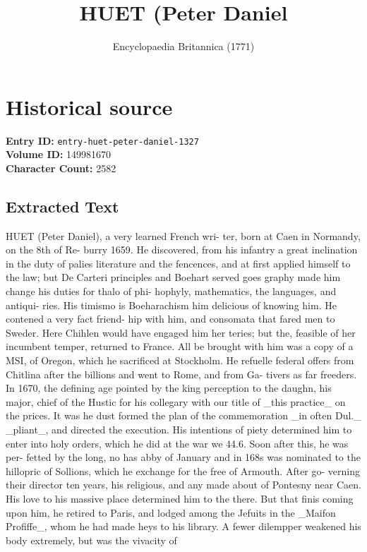 \documentclass{article}
\title{HUET (Peter Daniel}
\date{Encyclopaedia Britannica (1771)}
\begin{document}
\maketitle

\section*{Historical source}
\textbf{Entry ID:} \texttt{entry-huet-peter-daniel-1327} \\
\textbf{Volume ID:} 149981670 \\
\textbf{Character Count:} 2582

\subsection*{Extracted Text}
HUET (Peter Daniel), a very learned French wri-
ter, born at Caen in Normandy, on the 8th of Re-
burry 1659. He discovered, from his infantry a
great inclination in the duty of palies literature and
the fencences, and at first applied himself to the law;
but De Carteri principles and Boehart served goes
graphy made him change his duties for thalo of phi-
hophyly, mathematics, the languages, and antiqui-
ries. His timismo is Boeharachism him delicious
of knowing him. He contened a very fact friend-
hip with him, and consomata that fared men to
Sweder. Here Chihlen would have engaged him
her teries; but the, feasible of her incumbent temper,
returned to France. All be brought with him was a
copy of a MSI, of Oregon, which he sacrificed at
Stockholm. He refuelle federal offers from Chitlina
after the billions and went to Rome, and from Ga-
tivers as far freeders. In 1670, the defining age
pointed by the king perception to the daughn, his
major, chief of the Hustic for his collegary with our
title of \_this practice\_ on the prices. It was he dust
formed the plan of the commemoration \_in often Dul.\_
\_pliant\_, and directed the execution. His intentions of
piety determined him to enter into holy orders, which
he did at the war we 44.6. Soon after this, he was per-
fetted by the long, no has abby of January and in
168s was nominated to the hillopric of Sollions, which
he exchange for the free of Armouth. After go-
verning their director ten years, his religious, and any
made about of Pontesny near Caen. His love to his
massive place determined him to the there. But that
finis coming upon him, he retired to Paris, and lodged
among the Jefuits in the \_Maifon Profiffe\_, whom he had made heys to his library. A fewer dilempper
weakened his body extremely, but was the vivacity of
\end{document}
